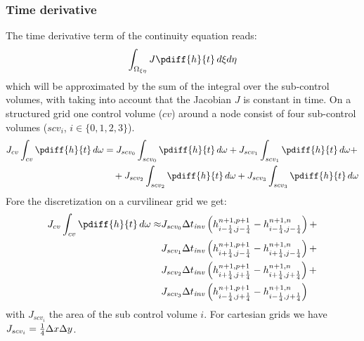 \subsubsection{Time derivative}\label{sec:time_derivative_curvilinear}
The time derivative term of the continuity equation reads:
\begin{align}
    \int_{\Omega_{\xi\eta}} J \pdiff{h}{t}\, d\xi d\eta
\end{align}
which will be approximated by the sum of the integral over the sub-control volumes,
with taking into account that the Jacobian $J$ is constant in time.
On a structured grid one control volume ($cv$) around a node consist of four sub-control volumes ($scv_i$, $i\in\{0,1,2,3\}$).
\begin{align}
    J_{cv}\int_{cv} \pdiff{h}{t}\, d\omega &=
    J_{scv_0}\int_{scv_0} \pdiff{h}{t}\, d\omega +
    J_{scv_1}\int_{scv_1} \pdiff{h}{t}\, d\omega +
    \nonumber \\*
    &\quad
    +J_{scv_2}\int_{scv_2} \pdiff{h}{t}\, d\omega +
    J_{scv_3}\int_{scv_3} \pdiff{h}{t}\, d\omega
\end{align}
Fore the discretization on a curvilinear grid we get:
\begin{align}
    J_{cv}\int_{cv} \pdiff{h}{t}\, d\omega \approx &
    J_{scv_0}\Dtinv \left( h^{n+1,p+1}_{i-\quart, j-\quart} -  h^{n+1,n}_{i-\quart, j-\quart} \right) +
    \nonumber \\*
    &J_{scv_1}\Dtinv \left( h^{n+1,p+1}_{i+\quart, j-\quart} -  h^{n+1,n}_{i+\quart, j-\quart} \right) +
    \nonumber \\*
    &J_{scv_2}\Dtinv \left( h^{n+1,p+1}_{i+\quart, j+\quart} -  h^{n+1,n}_{i+\quart, j+\quart} \right) +
    \nonumber \\*
    &J_{scv_3}\Dtinv \left( h^{n+1,p+1}_{i-\quart, j+\quart} -  h^{n+1,n}_{i-\quart, j+\quart} \right)
\end{align}
with $J_{scv_i}$ the area of the sub control volume $i$.
For cartesian grids we have $J_{scv_i} = \frac{1}{4} \Delta x\Delta y$.

